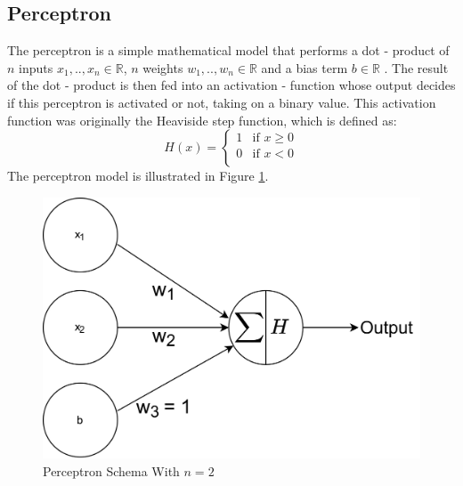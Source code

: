 \subsection{Perceptron}
The perceptron is a simple mathematical model that performs a dot - product of $n$ inputs $x_1, .., x_n \in \mathbb{R}$, $n$ weights $w_1, .., w_n \in \mathbb{R}$ and a bias term $b \in \mathbb{R}$ \cite{rosenblatt1958perceptron}. The result of the dot - product is then fed into an activation - function whose output decides if this perceptron is activated or not, taking on a binary value. This activation function was originally the Heaviside step function, which is defined as:\\
\begin{equation}
        H(x) = \left\{
	\begin{array}{ll}
		\text{1} & \mbox{if } x \geq 0\\
		\text{0} & \mbox{if } x < 0 \\
	\end{array}
\right.
    \end{equation}
The perceptron model is illustrated in Figure \ref{fig:perceptron}.

\begin{figure}[ht]
    \centering
    \includegraphics[scale=0.12]{images/perceptron.jpg}
    \caption{Perceptron Schema With $n=2$}
    \label{fig:perceptron}
\end{figure}

